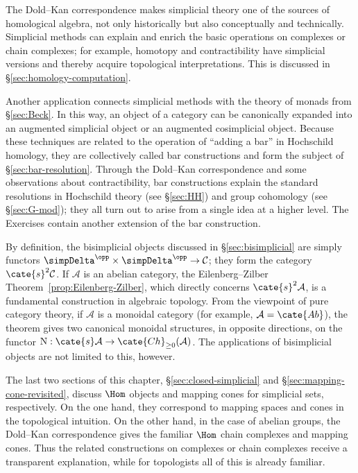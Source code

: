 The Dold--Kan correspondence makes simplicial theory one of the sources of
homological algebra, not only historically but also conceptually and
technically. Simplicial methods can explain and enrich the basic operations
on complexes or chain complexes; for example, homotopy and contractibility
have simplicial versions and thereby acquire topological interpretations.
This is discussed in \S\ref{sec:homology-computation}.

Another application connects simplicial methods with the theory of monads
from \S\ref{sec:Beck}. In this way, an object of a category can be canonically
expanded into an augmented simplicial object or an augmented cosimplicial
object. Because these techniques are related to the operation of ``adding a
bar'' in Hochschild homology, they are collectively called bar constructions
and form the subject of \S\ref{sec:bar-resolution}. Through the Dold--Kan
correspondence and some observations about contractibility, bar constructions
explain the standard resolutions in Hochschild theory (see \S\ref{sec:HH})
and group cohomology (see \S\ref{sec:G-mod}); they all turn out to arise from
a single idea at a higher level. The Exercises contain another extension of
the bar construction.

By definition, the bisimplicial objects discussed in
\S\ref{sec:bisimplicial} are simply functors
$\simpDelta^{\opp}\times\simpDelta^{\opp}\to\mathcal{C}$; they form the
category $\cate{s}^2\mathcal{C}$. If $\mathcal{A}$ is an abelian category,
the Eilenberg--Zilber Theorem~\ref{prop:Eilenberg-Zilber}, which directly
concerns $\cate{s}^2\mathcal{A}$, is a fundamental construction in algebraic
topology. From the viewpoint of pure category theory, if $\mathcal{A}$ is a
monoidal category (for example, $\mathcal{A}=\cate{Ab}$), the theorem gives
two canonical monoidal structures, in opposite directions, on the functor
$\mathrm{N}:\cate{s}\mathcal{A}\to\cate{Ch}_{\geq0}(\mathcal{A})$. The
applications of bisimplicial objects are not limited to this, however.

The last two sections of this chapter, \S\ref{sec:closed-simplicial} and
\S\ref{sec:mapping-cone-revisited}, discuss $\Hom$ objects and mapping cones
for simplicial sets, respectively. On the one hand, they correspond to
mapping spaces and cones in the topological intuition. On the other hand, in
the case of abelian groups, the Dold--Kan correspondence gives the familiar
$\Hom$ chain complexes and mapping cones. Thus the related constructions on
complexes or chain complexes receive a transparent explanation, while for
topologists all of this is already familiar.

